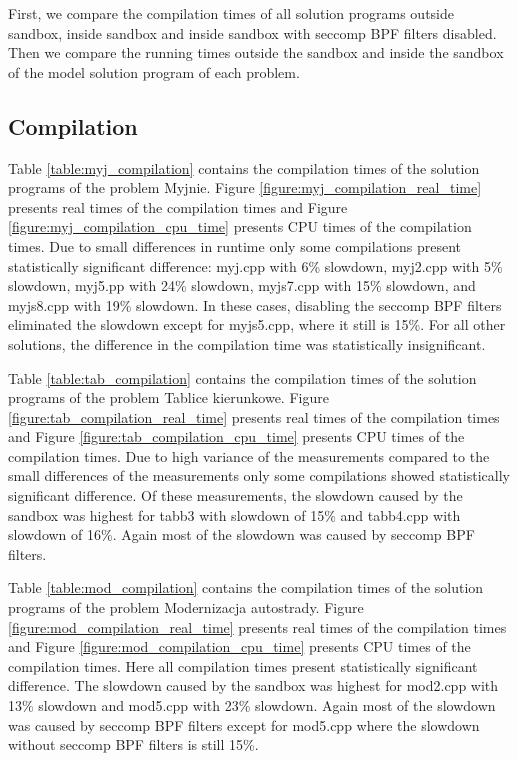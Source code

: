 \documentclass[en]{pracamgr}
\begin{document}
First, we compare the compilation times of all solution programs outside sandbox, inside sandbox and inside sandbox with seccomp BPF filters disabled. Then we compare the running times outside the sandbox and inside the sandbox of the model solution program of each problem.

\subsection{Compilation}

Table \ref{table:myj_compilation} contains the compilation times of the solution programs of the problem Myjnie. Figure \ref{figure:myj_compilation_real_time} presents real times of the compilation times and Figure \ref{figure:myj_compilation_cpu_time} presents CPU times of the compilation times. Due to small differences in runtime only some compilations present statistically significant difference: myj.cpp with 6\% slowdown, myj2.cpp with 5\% slowdown, myj5.pp with 24\% slowdown, myjs7.cpp with 15\% slowdown, and myjs8.cpp with 19\% slowdown. In these cases, disabling the seccomp BPF filters eliminated the slowdown except for myjs5.cpp, where it still is 15\%. For all other solutions, the difference in the compilation time was statistically insignificant.

Table \ref{table:tab_compilation} contains the compilation times of the solution programs of the problem Tablice kierunkowe. Figure \ref{figure:tab_compilation_real_time} presents real times of the compilation times and Figure \ref{figure:tab_compilation_cpu_time} presents CPU times of the compilation times. Due to high variance of the measurements compared to the small differences of the measurements only some compilations showed statistically significant difference. Of these measurements, the slowdown caused by the sandbox was highest for tabb3 with slowdown of 15\% and tabb4.cpp with slowdown of 16\%. Again most of the slowdown was caused by seccomp BPF filters.

Table \ref{table:mod_compilation} contains the compilation times of the solution programs of the problem Modernizacja autostrady. Figure \ref{figure:mod_compilation_real_time} presents real times of the compilation times and Figure \ref{figure:mod_compilation_cpu_time} presents CPU times of the compilation times. Here all compilation times present statistically significant difference. The slowdown caused by the sandbox was highest for mod2.cpp with 13\% slowdown and mod5.cpp with 23\% slowdown. Again most of the slowdown was caused by seccomp BPF filters except for mod5.cpp where the slowdown without seccomp BPF filters is still 15\%.
\end{document}
